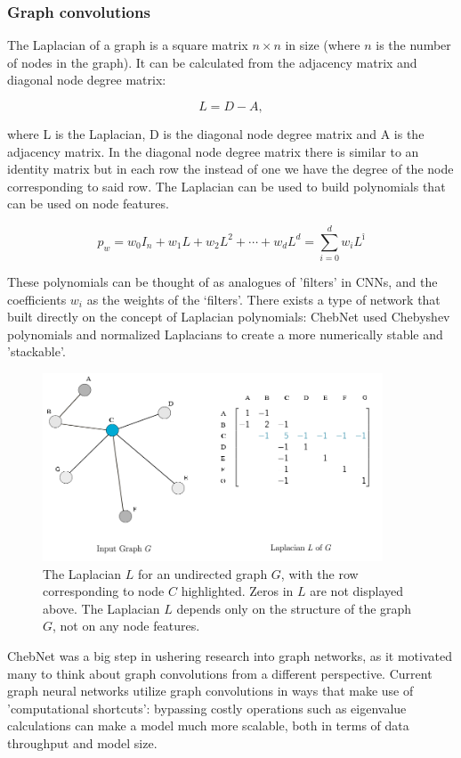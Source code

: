 	\subsubsection{Graph convolutions}
	
	The Laplacian of a graph is a square matrix $n \times n$ in size (where $n$ is the number of nodes in the graph). It can be calculated from the adjacency matrix and diagonal node degree matrix:
	
	$$ L = D - A, $$
	
	where L is the Laplacian, D is the diagonal node degree matrix and A is the adjacency matrix. In the diagonal node degree matrix there is similar to an identity matrix but in each row the instead of one we have the degree of the node corresponding to said row. The Laplacian can be used to build polynomials that can be used on node features.
	
	$$ p_w = w_0 I_n + w_1 L + w_2 L^2 + \cdots + w_d L^d = \sum_{i=0}^{d} w_i L^î $$
	
	These polynomials can be thought of as analogues of 'filters' in CNNs, and the coefficients $w_i$ as the weights of the ‘filters’. There exists a type of network that built directly on the concept of Laplacian polynomials: ChebNet used Chebyshev polynomials and normalized Laplacians to create a more numerically stable and 'stackable'.
	
	\begin{figure}[!h]
		\centering
		\includegraphics[width=0.9\textwidth]{figures/Laplacian.png}
		\caption{The Laplacian $L$ for an undirected graph $G$, with the row corresponding to node $C$ highlighted. Zeros in $L$ are not displayed above. The Laplacian $L$ depends only on the structure of the graph $G$, not on any node features. \cite{daigavane2021understanding}}
	\end{figure}
	
	ChebNet was a big step in ushering research into graph networks, as it motivated many to think about graph convolutions from a different perspective. Current graph neural networks utilize graph convolutions in ways that make use of 'computational shortcuts': bypassing costly operations such as eigenvalue calculations can make a model much more scalable, both in terms of data throughput and model size.
	
